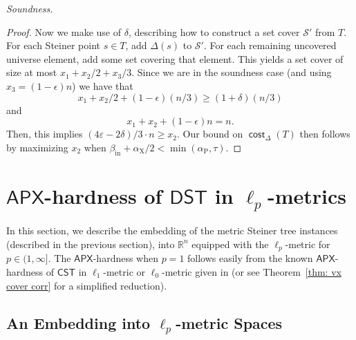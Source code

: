 \documentclass{article}\providecommand{\DeclareRedundantLanguages}[2]{}\usepackage[a4paper,margin=20mm]{geometry}
\DeclareMathOperator{\cost}{\mathsf{cost}}
\newcommand{\R}{\mathbb{R}}
\newcommand{\1}{\textbf{1}}
\newcommand{\cst}{$\mathsf{CST}$\xspace}
\newcommand{\dst}{$\mathsf{DST}$\xspace}
\newcommand{\apx}{$\mathsf{APX}$\xspace}
\newcommand{\td}{\tau}
\newcommand{\srd}{\alpha_{\text{X}}}
\newcommand{\trd}{\alpha_{\text{P}}}
\begin{document}
\begin{paragraph}{\textit{Soundness.}}
\begin{proof}
 Now we make use of $\delta$, describing how to construct a set cover $\mathcal{S}'$ from $T$. For each Steiner point $s \in T$, add $\Delta(s)$ to $\mathcal{S}'$. For each remaining uncovered universe element, add some set covering that element. This yields a set cover of size at most $x_1 + x_2/2 + x_3/3$. Since we are in the soundness case (and using $x_3 = (1-\epsilon)n$) we have that
 \[
 x_1 + x_2/2 + (1-\epsilon)(n/3) \geq (1+\delta)(n/3)
 \]
 and 
\[
x_1 + x_2 + (1-\epsilon)n = n.
\]
Then, this implies $(4\varepsilon  - 2\delta)/3 \cdot n \geq x_2$. Our bound on $\cost_{\Delta}(T)$ then follows by maximizing $x_2$ when $\beta_{\text{in}} + \srd/2 < \min(\trd, \td)$.
 \end{proof}
 \end{paragraph}
 


\section{\texorpdfstring{\apx}{APX}-hardness of  \texorpdfstring{\dst}{DST} in \texorpdfstring{$\ell_p$}{lp}-metrics} \label{sec: l_p}


In this section, we describe the embedding of the metric Steiner tree instances (described in the previous section), into $\R^n$ equipped with the $\ell_p$-metric for $p \in (1, \infty]$. The \apx-hardness when $p = 1$ follows easily from the known \apx-hardness of  \cst in $\ell_1$-metric or $\ell_0$-metric given in  \cite{Trevisan00} (or see Theorem~\ref{thm: vx cover corr} for a simplified reduction). 

\subsection{An Embedding into \texorpdfstring{$\ell_p$}{lp}-metric Spaces} \label{subsec: ell_p embedding}
 
\end{document}
